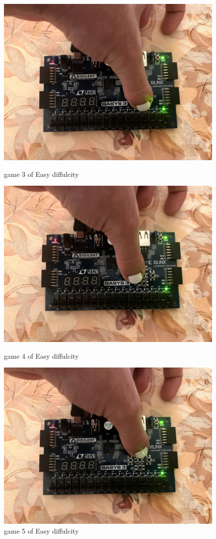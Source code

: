 \documentclass[11pt]{article}
\begin{document}
\begin{figure}[ht]
	\includegraphics{IMG_1313.JPG}
	\caption{game 3 of Easy diffulcity }
	\label{fig:sim_with_table}
	
	\includegraphics{IMG_1314.JPG}
	\caption{game 4 of Easy diffulcity }
	\label{fig:sim_with_table}
	
	\includegraphics{IMG_1315.JPG}
	\caption{game 5 of Easy diffulcity }
	\label{fig:sim_with_table}
	

\end{figure}
\end{document}
